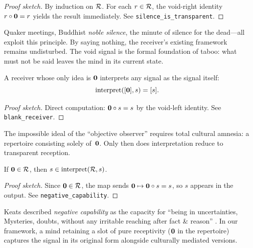 \begin{proof}[Proof sketch]
By induction on $\mathcal{R}$.  For each $r \in \mathcal{R}$, the void-right identity
$r \circ \mathbf{0} = r$ yields the result immediately.
See \texttt{silence\_is\_transparent}.
\end{proof}

\begin{remark}
Quaker meetings, Buddhist \emph{noble silence}, the minute of silence
for the dead---all exploit this principle.  By saying nothing, the
receiver's existing framework remains undisturbed.  The void signal is
the formal foundation of taboo: what must not be said leaves the mind in
its current state.
\end{remark}

\begin{theorem}
\label{thm:blank-receiver}
A receiver whose only idea is $\mathbf{0}$ interprets any signal as the
signal itself:
\[
  \operatorname{interpret}([\mathbf{0}], s) = [s].
\]
\end{theorem}

\begin{proof}[Proof sketch]
Direct computation: $\mathbf{0} \circ s = s$ by the void-left identity.
See \texttt{blank\_receiver}.
\end{proof}

\begin{remark}
The impossible ideal of the ``objective observer'' requires total
cultural amnesia: a repertoire consisting solely of~$\mathbf{0}$.  Only then
does interpretation reduce to transparent reception.
\end{remark}

\begin{theorem}
\label{thm:negative-capability}
If $\mathbf{0} \in \mathcal{R}$, then $s \in \operatorname{interpret}(\mathcal{R}, s)$.
\end{theorem}

\begin{proof}[Proof sketch]
Since $\mathbf{0} \in \mathcal{R}$, the map sends $\mathbf{0} \mapsto \mathbf{0} \circ s = s$,
so $s$ appears in the output.
See \texttt{negative\_capability}.
\end{proof}

\begin{remark}
Keats described \emph{negative capability} as the capacity for ``being
in uncertainties, Mysteries, doubts, without any irritable reaching after
fact \& reason'' \cite{keats1817}.  In our framework, a mind retaining a
slot of pure receptivity ($\mathbf{0}$ in the repertoire) captures the signal
in its original form alongside culturally mediated versions.
\end{remark}


